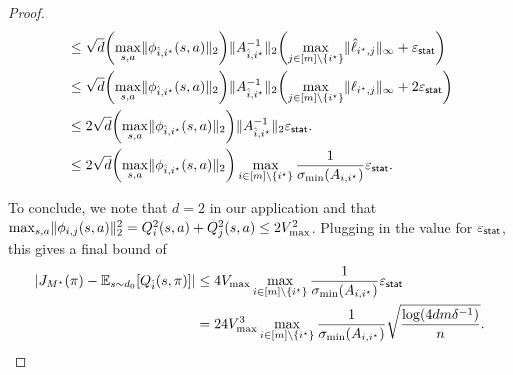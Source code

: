 \begin{proof}
\begin{align}
  &\leq \sqrt{d}\prn*{\max_{s,a}\nrm{\phi_{\hat{i},i^\star}(s,a)}_2}\nrm{A^{-1}_{\hat{i},i^\star}}_2\prn*{\max_{j \in [m]\setminus\crl{i^\star}}\nrm{\hat{\ell}_{i^\star,j}}_\infty + \vepsstat}\\
  &\leq \sqrt{d}\prn*{\max_{s,a}\nrm{\phi_{\hat{i},i^\star}(s,a)}_2}\nrm{A^{-1}_{\hat{i},i^\star}}_2\prn*{\max_{j \in [m]\setminus\crl{i^\star}}\nrm{\ell_{i^\star,j}}_\infty + 2\vepsstat}\\
  &\leq 2\sqrt{d}\prn*{\max_{s,a}\nrm{\phi_{\hat{i},i^\star}(s,a)}_2}\nrm{A^{-1}_{\hat{i},i^\star}}_2 \vepsstat.\\
  &\leq 2\sqrt{d}\prn*{\max_{s,a}\nrm{\phi_{\hat{i},i^\star}(s,a)}_2}\max_{i \in [m] \setminus \crl{i^\star}}\frac{1}{\sigma_{\min}(A_{i,i^\star})} \vepsstat.\\
\end{align}

To conclude, we note that $d=2$ in our application and that $
\max_{s,a}\lVert\phi_{i,j}(s,a)\rVert^2_2 = Q_i^2(s,a) + Q_j^2(s,a) \leq 2V_{\max}^2$. Plugging in the value for $\varepsilon_{\mathsf{stat}}$, this gives a final bound of 
\begin{align}
\lvert J_{M^\star}(\pi) - \mathbb{E}_{s \sim d_0}[Q_{\hat{i}}(s,\pi)]\rvert &\leq 4 V_{\max} \max_{i \in [m] \setminus \{i^\star\}}\frac{1}{\sigma_{\min}(A_{i,i^\star})} \varepsilon_{\mathsf{stat}} \\
&= 24 V_{\max}^3 \max_{i \in [m] \setminus \{i^\star\}}\frac{1}{\sigma_{\min}(A_{i,i^\star})}  \sqrt{\frac{\log(4dm\delta^{-1})}{n}}.
\end{align}

%
%
%
%
%
%
%
%

%

\end{proof}